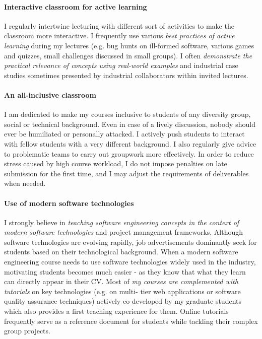 \documentclass[a4paper,11pt]{report}
\begin{document}
\paragraph{Interactive classroom for active learning}
I regularly intertwine lecturing with different sort of activities to make the classroom more interactive. I frequently use 
various \emph{best practices of active learning} during my lectures (e.g. bug hunts on ill-formed software, various games 
and quizzes, small challenges discussed in small groups). I often \emph{demonstrate the practical relevance of concepts 
using real-world examples} and industrial case studies sometimes presented by industrial collaborators within invited 
lectures. 

\paragraph{An all-inclusive classroom}
I am dedicated to make my courses inclusive to students of any diversity group, social or technical background. Even in case of a lively discussion, nobody should ever be humiliated or personally attacked. I actively push students to interact with fellow students with a very different background. I also regularly give advice to problematic teams to carry out groupwork more effectively. In order to reduce stress caused by high course workload, I do not impose penalties on late submission for the first time, and I may adjust the requirements of deliverables when needed. 


\paragraph{Use of modern software technologies}
I strongly believe in \emph{teaching software engineering concepts in the context of modern software technologies} and 
project management frameworks. Although software technologies are evolving rapidly, job advertisements dominantly seek 
for students based on their technological background. When a modern software engineering course needs to use software 
technologies widely used in the industry, motivating students becomes much easier - as they know that what they learn can 
directly appear in their CV. Most of \emph{my courses are complemented with tutorials} on key technologies (e.g. on multi-
tier web applications or software quality assurance techniques) actively co-developed by my graduate students which also 
provides a first teaching experience for them. Online tutorials frequently serve as a reference document for students while 
tackling their complex group projects.
\end{document}
